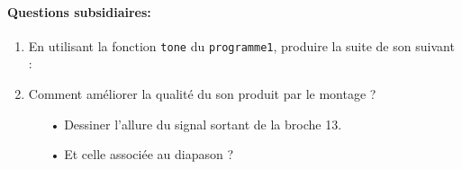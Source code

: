 \documentclass[12pt,a4paper]{article}
\begin{document}
\paragraph{Questions subsidiaires:}
\begin{enumerate}[resume]
\item En utilisant la fonction \texttt{tone} du \texttt{programme1}, produire la suite de son suivant :

\item Comment améliorer la qualité du son produit par le montage ?
\begin{itemize}
\item[•] Dessiner l'allure du signal sortant de la broche 13.
\item[•] Et celle associée au diapason ?
\end{itemize}
\end{enumerate}
\end{document}
